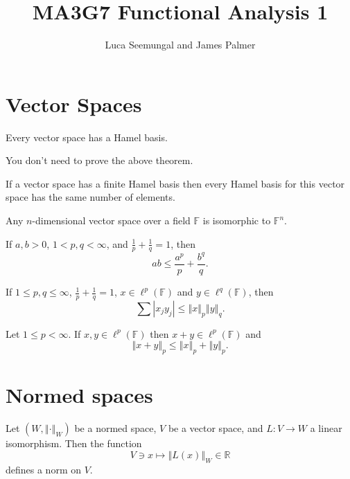 \documentclass[a4paper]{article}
\title{MA3G7 Functional Analysis 1}
\author{Luca Seemungal and James Palmer}
\newcommand{\F}{\mathbb{F}}
\newcommand{\R}{\mathbb{R}}
\newcommand{\norm}[1]{\left\Vert #1 \right\Vert}
\newcommand{\oneover}[1]{\frac{1}{#1}}
\newcommand{\<}{\langle}
\renewcommand{\>}{\rangle}
\begin{document}
\maketitle
\tableofcontents

\section{Vector Spaces}

\begin{thm}
  Every vector space has a Hamel basis.
\end{thm}

You don't need to prove the above theorem.

\begin{thm}
  If a vector space has a finite Hamel basis then every Hamel basis for this vector space has the same number of elements.
\end{thm}

\begin{prop}
  Any $n$-dimensional vector space over a field $\F$ is isomorphic to $\F^n$.
\end{prop}

\begin{lemma}
  If $a,b>0$, $1<p,q<\infty$, and $\frac{1}{p} + \frac{1}{q} = 1$, then
  $$ ab \leq \frac{a^p}{p} + \frac{b^q}{q}.$$
\end{lemma}

\begin{lemma}
  If $1\leq p,q\leq\infty$, $\oneover{p} + \oneover{q} = 1$, $x\in\ell^p(\F)$ and $y\in\ell^q(\F)$, then
  $$\sum |x_jy_j| \leq \norm{x}_p\norm{y}_q.$$
\end{lemma}

\begin{lemma}
  Let $1\leq p<\infty$. If $x,y\in\ell^p(\F)$ then $x+y\in\ell^p(\F)$ and
  $$\norm{x+y}_p \leq \norm{x}_p + \norm{y}_p.$$
\end{lemma}

\section{Normed spaces}

\begin{prop}
  Let $(W,\norm{\cdot}_W)$ be a normed space, $V$ be a vector space, and $L:V\to W$ a linear isomorphism. Then the function
  $$V\ni x\mapsto \norm{L(x)}_W \in\R$$
  defines a norm on $V$.
\end{prop}
\end{document}
